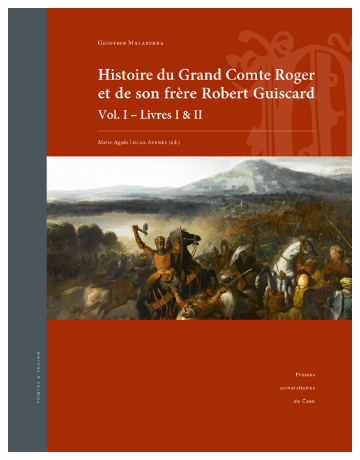 \documentclass[a4paper,12pt,twoside]{book}
\begin{document}
  \begin{figure}[H]
    \centering
    \begin{subfigure}[b]{0.3\linewidth}
      \includegraphics[width=\linewidth]{img/autre/couvMalaterra.jpg}
    \end{subfigure}
    \begin{subfigure}[b]{0.3\linewidth}

\end{subfigure}
\end{figure}
\end{document}
